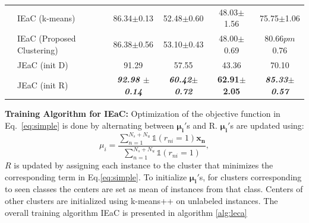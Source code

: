 \documentclass[letterpaper]{article}
\begin{document}
\begin{table}[ht]
\begin{minipage}{\textwidth}
\begin{tabular}{|l|l|c|c|c|c|}
& IEaC (k-means)                             & 86.34$\pm$0.13               & 52.48$\pm$0.60              & 48.03$\pm$1.56              & 75.75$\pm$1.06 \\
& IEaC (Proposed Clustering)                             & 86.38$\pm$0.56               & 53.10$\pm$0.43              & 48.00$\pm$0.69              & 80.66$pm$0.76 \\
& JEaC (init D)                     & 91.29                        & 57.55                       & 43.36          & 70.10\\
& JEaC (init R)                     & \textbf{\em 92.98 $\pm$0.14}  & \textbf{\em 60.42$\pm$0.72} & \textbf{62.91$\pm$2.05} & \textbf{\em 85.33$\pm$0.57} \\
\hline
\end{tabular}
\end{minipage}
\end{table}
\textbf{Training Algorithm for IEaC: } %
Optimization of  the objective function in Eq.~\eqref{eq:simple} is done by alternating between
$\mathbf{\mu_i'}$s and R. $\mathbf{\mu_i'}$s are updated using:
\begin{equation} \label{eq:updata_mu}
  \mu_i = \frac{\sum_{n=1}^{N_s + N_u}  \mathds{1}(r_{ni}=1)\mathbf{x_n}}{\sum_{n=1}^{N_s+N_u}\mathds{1}(r_{ni}=1)},
\end{equation}
$R$ is updated by assigning each instance  to the cluster that minimizes the corresponding term in Eq.\eqref{eq:simple}.
To initialize $\mathbf{\mu_i'}$s, for clusters corresponding to seen classes the centers are set as mean of instances from that class. Centers of other
clusters are initialized using k-means++ \cite{kmeanspp} on unlabeled instances.
The overall training algorithm IEaC is presented in algorithm \ref{alg:leca}
\end{document}
